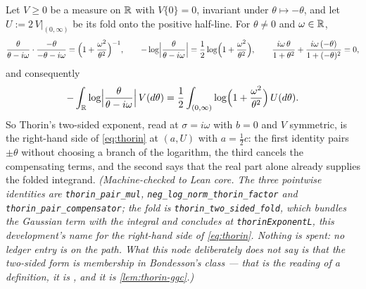 \begin{lemma}[Thorin's two-sided exponent at $\sigma = i\omega$]\label{lem:thorin-two-sided}
\leanok
{}
Let $V \ge 0$ be a measure on $\mathbb{R}$ with $V\{0\} = 0$, invariant under $\theta \mapsto -\theta$,
and let $U := 2\,V|_{(0,\infty)}$ be its fold onto the positive half-line. For $\theta \ne 0$ and
$\omega \in \mathbb{R}$,
\[
  \frac{\theta}{\theta - i\omega}\cdot\frac{-\theta}{-\theta - i\omega}
   = \Bigl(1 + \frac{\omega^2}{\theta^2}\Bigr)^{-1},
  \qquad
  -\log\Bigl|\frac{\theta}{\theta - i\omega}\Bigr|
   = \frac12\log\Bigl(1 + \frac{\omega^2}{\theta^2}\Bigr),
  \qquad
  \frac{i\omega\,\theta}{1+\theta^2} + \frac{i\omega\,(-\theta)}{1+(-\theta)^2} = 0 ,
\]
and consequently
\[
  -\int_{\mathbb{R}}\log\Bigl|\frac{\theta}{\theta - i\omega}\Bigr|\,V(d\theta)
   = \frac12\int_{(0,\infty)}\log\Bigl(1 + \frac{\omega^2}{\theta^2}\Bigr)\,U(d\theta) .
\]
So Thorin's two-sided exponent, read at $\sigma = i\omega$ with $b = 0$ and $V$ symmetric, is the
right-hand side of \ref{eq:thorin} at $(a, U)$ with $a = \tfrac12c$: the first identity pairs
$\pm\theta$ without choosing a branch of the logarithm, the third cancels the compensating terms,
and the second says that the real part alone already supplies the folded integrand.
\statusT\quad\emph{(Machine-checked to Lean core. The three pointwise identities are
\texttt{thorin\_pair\_mul}, \texttt{neg\_log\_norm\_thorin\_factor} and
\texttt{thorin\_pair\_compensator}; the fold is \texttt{thorin\_two\_sided\_fold}, which bundles
the Gaussian term with the integral and concludes at \texttt{thorinExponentL}, this development's
name for the right-hand side of \ref{eq:thorin}. Nothing is spent: no ledger entry is on the path.
What this node deliberately does \emph{not} say is that the two-sided form is membership in
Bondesson's class --- that is the reading of a definition, it is , and it is
\ref{lem:thorin-ggc}.)}
\end{lemma}

